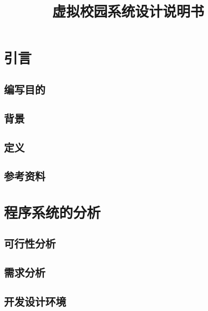 \documentclass{article}
\title{虚拟校园系统设计说明书}
\begin{document}
\maketitle

\newpage
\tableofcontents
\newpage

\section{引言}
\subsection{编写目的}
\subsection{背景}
\subsection{定义}
\subsection{参考资料}


\section{程序系统的分析}
\subsection{可行性分析}
\subsection{需求分析}
\subsection{开发设计环境}
\end{document}
